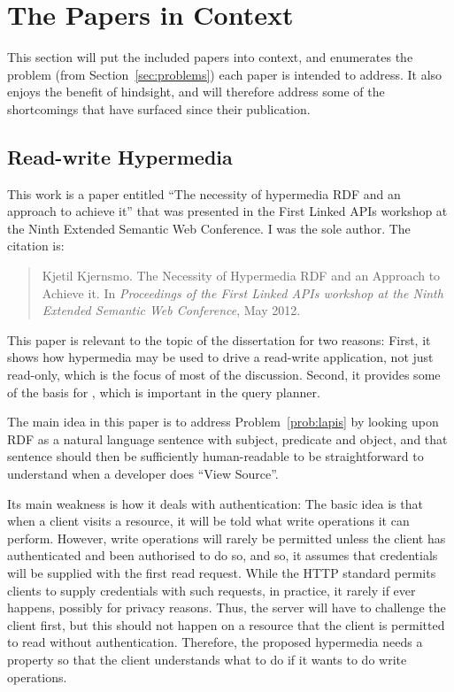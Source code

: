 \section{The Papers in Context}\label{sec:papersincontext}

This section will put the included papers into context, and enumerates
the problem (from Section~\ref{sec:problems}) each paper is intended
to address. It also enjoys the benefit of hindsight, and will
therefore address some of the shortcomings that have surfaced since
their publication.

\subsection{Read-write Hypermedia}\label{sec:conlapis}

This work is a paper entitled ``The necessity of hypermedia RDF and an
approach to achieve it'' that was presented in the First Linked APIs
workshop at the Ninth Extended Semantic Web Conference. I was the sole
author. The citation is:

\begin{quote}
Kjetil Kjernsmo.
\newblock The Necessity of Hypermedia RDF and an Approach to Achieve it.
\newblock In {\em Proceedings of the First Linked APIs workshop at the Ninth
  Extended Semantic Web Conference}, May 2012.
\end{quote}

This paper is relevant to the topic of the dissertation for two
reasons: First, it shows how hypermedia may be used to drive a
read-write application, not just read-only, which is the focus of most
of the discussion. Second, it provides some of the basis for
\cite{ldf1}, which is important in the query planner.

The main idea in this paper is to address Problem~\ref{prob:lapis} 
by looking upon RDF as a natural language
sentence with subject, predicate and object, and that sentence should
then be sufficiently human-readable to be straightforward to
understand when a developer does ``View Source''.

Its main weakness is how it deals with authentication: The basic idea
is that when a client visits a resource, it will be told what
write operations it can perform. However, write operations will rarely
be permitted unless the client has authenticated and been authorised
to do so, and so, it assumes that credentials will be supplied with
the first read request. While the HTTP standard permits clients to
supply credentials with such requests, in practice, it rarely if ever
happens, possibly for privacy reasons. Thus, the server will have to
challenge the client first, but this should not happen on a resource
that the client is permitted to read without authentication. 
Therefore, the proposed hypermedia needs a property so that the client
understands what to do if it wants to do write operations.

